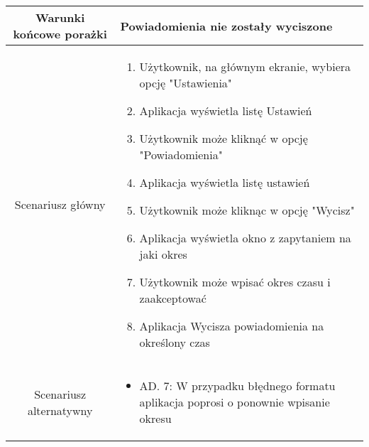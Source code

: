 \documentclass{article}
\begin{document}
\begin{enumerate}
\begin{table}[H]
\begin{tabular}{|c|p{7cm}|}
				\hline
				Warunki końcowe porażki & Powiadomienia nie zostały wyciszone                                                                                                                                                                                                                                                                                                                                                                                                                                      \\
				\hline
				Scenariusz główny       & \begin{enumerate}\item Użytkownik, na głównym ekranie, wybiera opcję "Ustawienia"

\item Aplikacja wyświetla listę Ustawień

\item Użytkownik może kliknąć w opcję "Powiadomienia"

\item Aplikacja wyświetla listę ustawień

\item Użytkownik może kliknąc w opcję "Wycisz"

\item Aplikacja wyświetla okno z zapytaniem na jaki okres

\item Użytkownik może wpisać okres czasu i zaakceptować

\item Aplikacja Wycisza powiadomienia na określony czas\end{enumerate} \\
				\hline
				Scenariusz alternatywny & \begin{itemize}\item AD. 7: W przypadku błędnego formatu aplikacja poprosi o ponownie wpisanie okresu\end{itemize}                                                                                                                                                                                                                                                                                                                                                       \\
				\hline
			\end{tabular}
		\end{table}


\end{enumerate}
\end{document}
